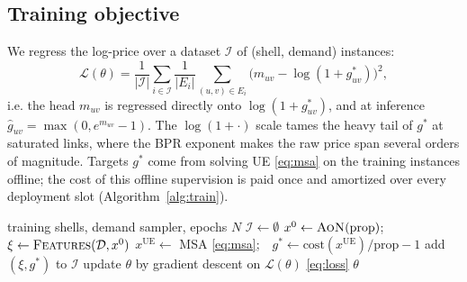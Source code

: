 \documentclass[journal]{IEEEtran}
\newcommand{\cost}{\mathrm{cost}}
\newcommand{\prop}{\mathrm{prop}}
\newcommand{\AoN}{\textsc{AoN}}
\begin{document}
\subsection{Training objective}
We regress the log-price over a dataset $\mathcal{I}$ of (shell, demand) instances:
\begin{equation}
\mathcal{L}(\theta)=\frac{1}{|\mathcal{I}|}\sum_{i\in\mathcal{I}}\frac{1}{|E_i|}
\sum_{(u,v)\in E_i}\!\Big(m_{uv}-\log(1{+}g^{*}_{uv})\Big)^2 ,
\label{eq:loss}
\end{equation}
i.e. the head $m_{uv}$ is regressed directly onto $\log(1{+}g^{*}_{uv})$, and at inference
$\hat g_{uv}=\max(0,e^{m_{uv}}-1)$.
The $\log(1{+}\cdot)$ scale tames the heavy tail of $g^{*}$ at saturated links, where the
BPR exponent makes the raw price span several orders of magnitude. Targets $g^{*}$ come
from solving UE \eqref{eq:msa} on the training instances offline; the cost of this
offline supervision is paid once and amortized over every deployment slot
(Algorithm~\ref{alg:train}).

\begin{algorithm}[t]
\caption{Offline supervision}
\label{alg:train}
\begin{algorithmic}[1]
\Require training shells, demand sampler, epochs $N$
\State $\mathcal{I}\gets\emptyset$
  \State $x^{0}\gets\AoN(\prop)$;\ \ $\xi\gets\textsc{Features}(\mathcal{D},x^{0})$
  \State $x^{\mathrm{UE}}\gets$ MSA \eqref{eq:msa};\ \ $g^{*}\gets \cost(x^{\mathrm{UE}})/\prop-1$
  \State add $(\xi,g^{*})$ to $\mathcal{I}$
\EndFor
{}
  \State update $\theta$ by gradient descent on $\mathcal{L}(\theta)$ \eqref{eq:loss}
\EndFor
\State \Return $\theta$
\end{algorithmic}
\end{algorithm}
\end{document}

